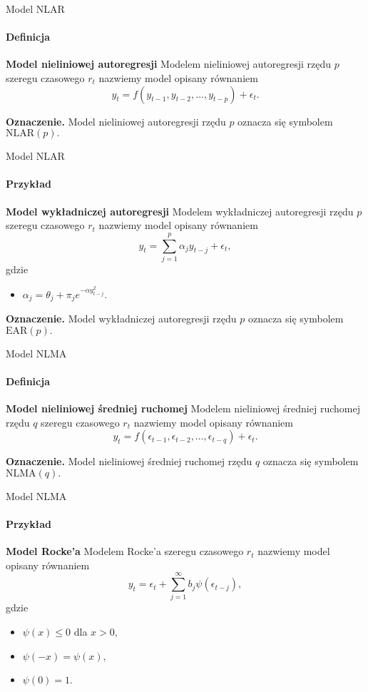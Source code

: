 \documentclass[a4paper, 11pt]{beamer}
\begin{document}
	\begin{frame}{Model NLAR}
		\framesubtitle{Definicja}
		\begin{block}{\textbf{Model nieliniowej autoregresji}}
			Modelem nieliniowej autoregresji rzędu $p$ szeregu czasowego $r_t$ nazwiemy model
			opisany równaniem \[
				y_t = f\left(y_{t-1}, y_{t-2}, \ldots, y_{t-p}\right) + \epsilon_t.
			\]
		\end{block}
		\begin{alert}{\textbf{Oznaczenie.}}
			Model nieliniowej autoregresji rzędu $p$ oznacza się symbolem $\mbox{NLAR}\left(p\right).$
		\end{alert}
	\end{frame}
	
	\begin{frame}{Model NLAR}
		\framesubtitle{Przykład}
		\begin{block}{\textbf{Model wykładniczej autoregresji}}
			Modelem wykładniczej autoregresji rzędu $p$ szeregu czasowego $r_t$ nazwiemy model
			opisany równaniem \[
				y_t = \sum_{j=1}^{p} \alpha_j y_{t-j} + \epsilon_t,
			\] gdzie
			\begin{itemize}
				\item $\alpha_j = \theta_j + \pi_j e^{-\alpha y_{t-j}^2}.$
			\end{itemize}
		\end{block}
		\begin{alert}{\textbf{Oznaczenie.}}
			Model wykładniczej autoregresji rzędu $p$ oznacza się symbolem $\mbox{EAR}\left(p\right).$
		\end{alert}
	\end{frame}
	
	\begin{frame}{Model NLMA}
		\framesubtitle{Definicja}
		\begin{block}{\textbf{Model nieliniowej średniej ruchomej}}
			Modelem nieliniowej średniej ruchomej rzędu $q$ szeregu czasowego $r_t$ nazwiemy model
			opisany równaniem \[
				y_t = f\left(\epsilon_{t-1}, \epsilon_{t-2}, \ldots, \epsilon_{t-q}\right) + \epsilon_t.
			\]
		\end{block}
		\begin{alert}{\textbf{Oznaczenie.}}
			Model nieliniowej średniej ruchomej rzędu $q$ oznacza się symbolem $\mbox{NLMA}\left(q\right).$
		\end{alert}
	\end{frame}
	
	\begin{frame}{Model NLMA}
		\framesubtitle{Przykład}
		\begin{block}{\textbf{Model Rocke'a}}
			Modelem Rocke'a szeregu czasowego $r_t$ nazwiemy model opisany równaniem \[
				y_t = \epsilon_t + \sum_{j=1}^{\infty} b_j \psi\left(\epsilon_{t-j}\right),
			\] gdzie
			\begin{itemize}
				\item $\psi\left(x\right) \leq 0$ dla $x > 0,$
				\item $\psi\left(-x\right)=\psi\left(x\right),$
				\item $\psi\left(0\right) = 1.$
			\end{itemize}
		\end{block}
	\end{frame}
	
\end{document}

